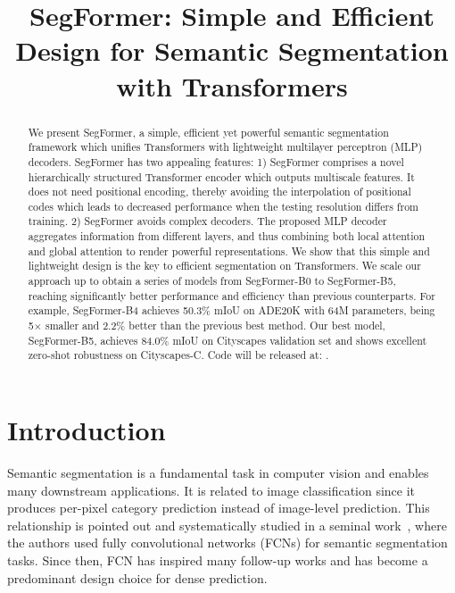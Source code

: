 \title{SegFormer: Simple and Efficient Design for Semantic Segmentation with Transformers}

\begin{abstract}
We present SegFormer, a simple, efficient yet powerful semantic segmentation framework which unifies Transformers with lightweight multilayer perceptron (MLP) decoders. SegFormer has two appealing features: 1) SegFormer comprises a novel  hierarchically structured Transformer encoder which  outputs multiscale features. It does not need positional encoding, thereby avoiding the interpolation of positional codes which leads to decreased performance when the testing resolution differs from training. 2) SegFormer avoids complex decoders. The proposed MLP decoder aggregates information from different layers, and thus combining both local attention and global attention to render powerful representations. We show that this simple and lightweight design is the key to efficient segmentation on Transformers. We scale our approach up to obtain a series of models from SegFormer-B0 to SegFormer-B5, reaching significantly better performance and efficiency than previous counterparts. For example, SegFormer-B4 achieves 50.3\% mIoU on ADE20K with 64M parameters, being 5$\times$ smaller and 2.2\% better than the previous best method. Our best model, SegFormer-B5, achieves 84.0\% mIoU on Cityscapes validation set and shows excellent zero-shot robustness on Cityscapes-C. Code will be released at: 
\href{https://github.com/NVlabs/SegFormer}{\color{blue}{$\tt github.com/NVlabs/SegFormer$}}.
\end{abstract}

\section{Introduction}

Semantic segmentation is a fundamental task in computer vision and enables many downstream applications. It is  related to image classification since it produces per-pixel category prediction instead of image-level prediction. This relationship is pointed out and systematically studied in a seminal work~\cite{fcn}, where the authors used fully convolutional networks (FCNs) for semantic segmentation tasks. Since then, FCN has inspired many follow-up works and has become a predominant design choice for dense prediction.

